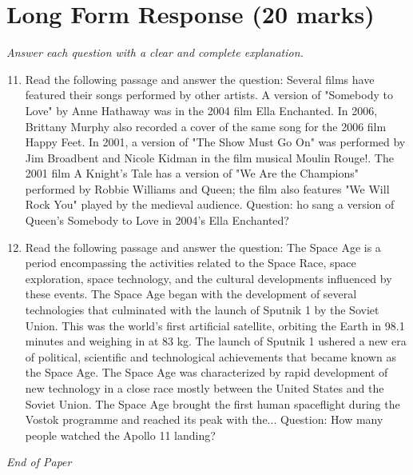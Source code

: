 \documentclass[12pt]{article}
\begin{document}
\section*{Long Form Response (20 marks)}
\textit{Answer each question with a clear and complete explanation.}
\begin{enumerate}[label=\arabic*.]
\setcounter{enumi}{10}
\item Read the following passage and answer the question: Several films have featured their songs performed by other artists. A version of "Somebody to Love" by Anne Hathaway was in the 2004 film Ella Enchanted. In 2006, Brittany Murphy also recorded a cover of the same song for the 2006 film Happy Feet. In 2001, a version of "The Show Must Go On" was performed by Jim Broadbent and Nicole Kidman in the film musical Moulin Rouge!. The 2001 film A Knight's Tale has a version of "We Are the Champions" performed by Robbie Williams and Queen; the film also features "We Will Rock You" played by the medieval audience. Question: ho sang a version of Queen's Somebody to Love in 2004's Ella Enchanted?
\item Read the following passage and answer the question: The Space Age is a period encompassing the activities related to the Space Race, space exploration, space technology, and the cultural developments influenced by these events. The Space Age began with the development of several technologies that culminated with the launch of Sputnik 1 by the Soviet Union. This was the world's first artificial satellite, orbiting the Earth in 98.1 minutes and weighing in at 83 kg. The launch of Sputnik 1 ushered a new era of political, scientific and technological achievements that became known as the Space Age. The Space Age was characterized by rapid development of new technology in a close race mostly between the United States and the Soviet Union. The Space Age brought the first human spaceflight during the Vostok programme and reached its peak with the... Question: How many people watched the Apollo 11 landing?
\end{enumerate}

\vfill
\noindent\textit{End of Paper}
\end{document}
